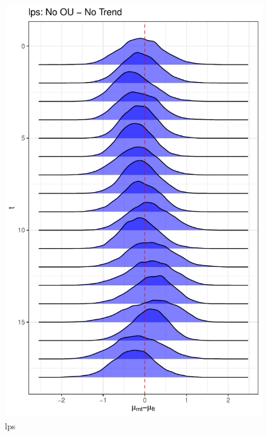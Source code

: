 \documentclass[
  12pt,
]{article}
\begin{document}
\begin{figure}

{\centering \includegraphics[width=0.9\linewidth]{../Figures/lps/mu_diff} 

}

\caption{lps}\label{fig:unnamed-chunk-11}
\end{figure}
\end{document}
